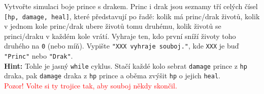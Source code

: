 \question[70]
Vytvořte simulaci boje prince s drakem. Princ i drak jsou seznamy tří celých čísel
\texttt{[hp, damage, heal]}, které představují po řadě: kolik má princ/drak
životů, kolik v jednom kole princ/drak ubere životů tomu druhému, kolik životů
se princi/draku v každém kole vrátí. Vyhraje ten, kdo první sníží životy toho
druhého na \texttt{0} (nebo míň). Vypište \texttt{"XXX vyhraje souboj."}, kde
\texttt{XXX} je buď \texttt{"Princ"} nebo \texttt{"Drak"}.\\
\textbf{Hint:} Tohle je jasný \texttt{while} cyklus. Stačí každé kolo sebrat
\texttt{damage} prince z \texttt{hp} draka, pak \texttt{damage} draka z
\texttt{hp} prince a oběma zvýšit \texttt{hp} o jejich \texttt{heal}.\\
\textcolor{red}{Pozor! Volte si ty trojice tak, aby souboj někdy skončil.}